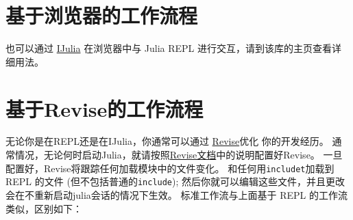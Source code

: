 \section{基于浏览器的工作流程}



也可以通过 \href{https://github.com/JuliaLang/IJulia.jl}{IJulia} 在浏览器中与 Julia REPL 进行交互，请到该库的主页查看详细用法。



\hypertarget{12794253722784581701}{}


\section{基于Revise的工作流程}



无论你是在REPL还是在IJulia，你通常可以通过 \href{https://github.com/timholy/Revise.jl}{Revise}优化 你的开发经历。 通常情况，无论何时启动Julia，就请按照\href{https://timholy.github.io/Revise.jl/stable/}{Revise文档}中的说明配置好Revise。 一旦配置好，Revise将跟踪任何加载模块中的文件变化。 和任何用\texttt{includet}加载到 REPL 的文件 (但不包括普通的\texttt{include}); 然后你就可以编辑这些文件，并且更改会在不重新启动julia会话的情况下生效。 标准工作流与上面基于 REPL 的工作流类似，区别如下：




